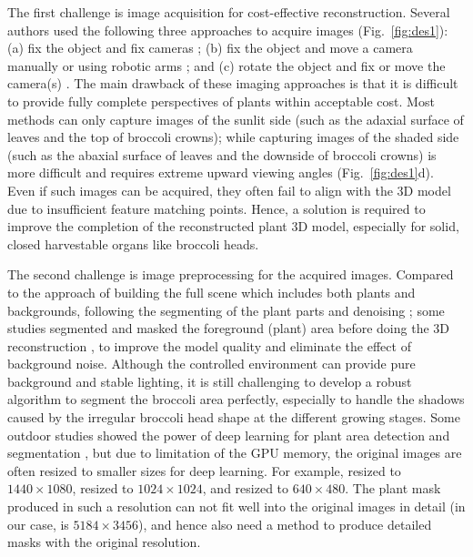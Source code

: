 

The first challenge is image acquisition for cost-effective reconstruction. Several authors used the following three approaches to acquire images (Fig.~\ref{fig:des1}): (a) fix the object and fix cameras \citep{nguyen_structured_2015}; (b) fix the object and move a camera manually \citep{xiao_image-based_2020} or using robotic arms \citep{cao_quantifying_2019,nguyen_3d_2016}; and (c) rotate the object and fix or move the camera(s) \citep{kochi_3d_2018,gao_novel_2021}. The main drawback of these imaging approaches is that it is difficult to provide fully complete perspectives of plants within acceptable cost. Most methods can only capture images of the sunlit side (such as the adaxial surface of leaves and the top of broccoli crowns); while capturing images of the shaded side (such as the abaxial surface of leaves and the downside of broccoli crowns) is more difficult and requires extreme upward viewing angles (Fig.~\ref{fig:des1}d). Even if such images can be acquired, they often fail to align with the 3D model due to insufficient feature matching points. Hence, a solution is required to improve the completion of the reconstructed plant 3D model, especially for solid, closed harvestable organs like broccoli heads.

The second challenge is image preprocessing for the acquired images. Compared to the approach of building the full scene which includes both plants and backgrounds, following the segmenting of the plant parts \citep{ge_method_2019} and denoising \citep{wu_mvs-pheno_2020}; some studies segmented and masked the foreground (plant) area before doing the 3D reconstruction \citep{nguyen_3d_2016,kochi_3d_2018}, to improve the model quality and eliminate the effect of background noise. Although the controlled environment can provide pure background and stable lighting, it is still challenging to develop a robust algorithm to segment the broccoli area perfectly, especially to handle the shadows caused by the irregular broccoli head shape at the different growing stages. Some outdoor studies showed the power of deep learning for plant area detection and segmentation \citep{zhou_monitoring_2020,blok_effect_2021,garcia_towards_2021}, but due to limitation of the GPU memory, the original images are often resized to smaller sizes for deep learning. For example, \citet{zhou_monitoring_2020} resized to $1440 \times 1080$, \citet{blok_effect_2021} resized to $1024 \times 1024$, and \citet{garcia_towards_2021} resized to $640 \times 480$. The plant mask produced in such a resolution can not fit well into the original images in detail (in our case, is $5184 \times 3456$), and hence also need a method to produce detailed masks with the original resolution.


